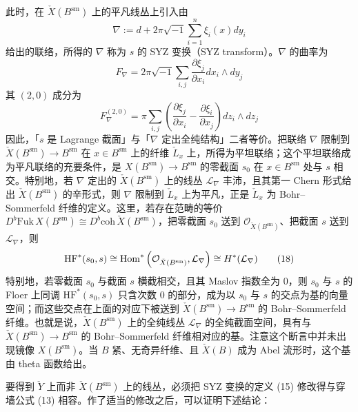 此时，在 $\check X(B^{\mathrm{sm}})$ 上的平凡线丛上引入由
\begin{equation}
\nabla:=d+2\pi\sqrt{-1}\sum_{i=1}^{n}\xi_i(x)dy_i
\tag{15}
\end{equation}
\noindent 给出的联络，所得的 $\nabla$ 称为 $s$ 的 SYZ 变换（SYZ transform）。$\nabla$ 的曲率为
\begin{equation}
F_\nabla=2\pi\sqrt{-1}\sum_{i,j}\frac{\partial\xi_j}{\partial x_i}dx_i\wedge dy_j
\tag{16}
\end{equation}
\noindent 其 $(2,0)$ 成分为
\begin{equation}
F^{(2,0)}_\nabla=\pi\sum_{i,j}\left(\frac{\partial\xi_j}{\partial x_i}-\frac{\partial\xi_i}{\partial x_j}\right)dz_i\wedge dz_j
\tag{17}
\end{equation}
\noindent 因此，「$s$ 是 Lagrange 截面」与「$\nabla$ 定出全纯结构」二者等价。把联络 $\nabla$ 限制到 $\check X(B^{\mathrm{sm}})\to B^{\mathrm{sm}}$ 在 $x\in B^{\mathrm{sm}}$ 上的纤维 $\check L_x$ 上，所得为平坦联络；这个平坦联络成为平凡联络的充要条件，是 $X(B^{\mathrm{sm}})\to B^{\mathrm{sm}}$ 的零截面 $s_0$ 在 $x\in B^{\mathrm{sm}}$ 处与 $s$ 相交。特别地，若 $\nabla$ 定出的 $\check X(B^{\mathrm{sm}})$ 上的线丛 $\mathcal L_\nabla$ 丰沛，且其第一 Chern 形式给出 $\check X(B^{\mathrm{sm}})$ 的辛形式，则 $\nabla$ 限制到 $\check L_x$ 上为平凡，正是 $\check L_x$ 为 Bohr--Sommerfeld 纤维的定义。这里，若存在范畴的等价 $D^b\mathrm{Fuk}\,X(B^{\mathrm{sm}})\cong D^b\mathrm{coh}\,\check X(B^{\mathrm{sm}})$，把零截面 $s_0$ 送到 $\mathcal O_{\check X(B^{\mathrm{sm}})}$、把截面 $s$ 送到 $\mathcal L_\nabla$，则
\begin{equation}
\mathrm{HF}^*(s_0,s)\cong\operatorname{Hom}^*\left(\mathcal O_{\check X(B^{\mathrm{sm}})},\mathcal L_\nabla\right)\cong H^*(\mathcal L_\nabla)
\tag{18}
\end{equation}
\noindent 特别地，若零截面 $s_0$ 与截面 $s$ 横截相交，且其 Maslov 指数全为 $0$，则 $s_0$ 与 $s$ 的 Floer 上同调 $\mathrm{HF}^*(s_0,s)$ 只含次数 $0$ 的部分，成为以 $s_0$ 与 $s$ 的交点为基的向量空间；而这些交点在上面的对应下被送到 $\check X(B^{\mathrm{sm}})\to B^{\mathrm{sm}}$ 的 Bohr--Sommerfeld 纤维。也就是说，$\check X(B^{\mathrm{sm}})$ 上的全纯线丛 $\mathcal L_\nabla$ 的全纯截面空间，具有与 $\check X(B^{\mathrm{sm}})\to B^{\mathrm{sm}}$ 的 Bohr--Sommerfeld 纤维相对应的基。注意这个断言中并未出现镜像 $X(B^{\mathrm{sm}})$。当 $B$ 紧、无奇异纤维、且 $\check X(B)$ 成为 Abel 流形时，这个基由 theta 函数给出。

要得到 $\check Y$ 上而非 $\check X(B^{\mathrm{sm}})$ 上的线丛，必须把 SYZ 变换的定义 (15) 修改得与穿墙公式 (13) 相容。作了适当的修改之后，可以证明下述结论：

